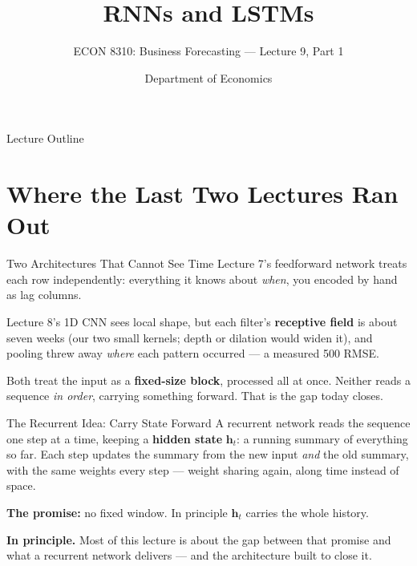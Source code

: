 \documentclass[aspectratio=169, 11pt]{beamer}
\title[RNNs \& LSTMs]{RNNs and LSTMs}
\subtitle{ECON 8310: Business Forecasting --- Lecture 9, Part 1}
\author{Department of Economics}
\institute{University of Nebraska at Omaha}
\begin{document}

\begin{frame}
  \titlepage
\end{frame}

\begin{frame}{Lecture Outline}
  \tableofcontents
\end{frame}

\section{Where the Last Two Lectures Ran Out}


\begin{frame}{Two Architectures That Cannot See Time}
  Lecture 7's feedforward network treats each row independently: everything it knows about
  \emph{when}, you encoded by hand as lag columns.

  \vspace{0.2cm}
  Lecture 8's 1D CNN sees local shape, but each filter's \textbf{receptive field} is about seven
  weeks (our two small kernels; depth or dilation would widen it), and pooling threw away \emph{where} each pattern occurred --- a measured 500 RMSE.

  \begin{keybox}
    Both treat the input as a \textbf{fixed-size block}, processed all at once. Neither reads a
    sequence \emph{in order}, carrying something forward. That is the gap today closes.
  \end{keybox}
\end{frame}

\begin{frame}{The Recurrent Idea: Carry State Forward}
  A recurrent network reads the sequence one step at a time, keeping a \textbf{hidden state}
  $\mathbf{h}_t$: a running summary of everything so far. Each step updates the summary from the
  new input \emph{and} the old summary, with the same weights every step --- weight sharing
  again, along time instead of space.

  \vspace{0.2cm}
  \textbf{The promise:} no fixed window. In principle $\mathbf{h}_t$ carries the whole history.

  \vspace{0.2cm}
  \textbf{In principle.} Most of this lecture is about the gap between that promise and what a
  recurrent network delivers --- and the architecture built to close it.
\end{frame}
\end{document}

